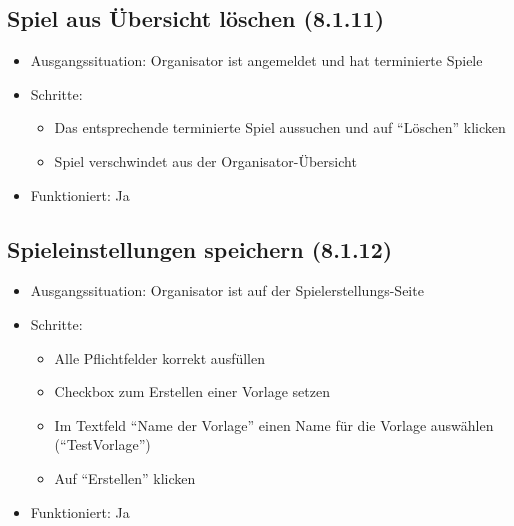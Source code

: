 \documentclass[a4paper]{scrreprt}
\begin{document}
            \subsection{Spiel aus Übersicht löschen (8.1.11)}
            \begin{itemize}
                \item Ausgangssituation: Organisator ist angemeldet und hat terminierte Spiele
                \item Schritte:
                    \begin{itemize}
                        \item Das entsprechende terminierte Spiel aussuchen und auf \enquote{Löschen} klicken
                        \item Spiel verschwindet aus der Organisator-Übersicht
                \end{itemize}
                \item Funktioniert: Ja
            \end{itemize}

            \subsection{Spieleinstellungen speichern (8.1.12)}
            \begin{itemize}
                \item Ausgangssituation: Organisator ist auf der Spielerstellungs-Seite
                \item Schritte:
                    \begin{itemize}
                        \item Alle Pflichtfelder korrekt ausfüllen
                        \item Checkbox zum Erstellen einer Vorlage setzen
                        \item Im Textfeld \enquote{Name der Vorlage} einen Name für die Vorlage auswählen (\enquote{TestVorlage})
                        \item Auf \enquote{Erstellen} klicken
                    \end{itemize}
                \item Funktioniert: Ja
            \end{itemize}
\end{document}
